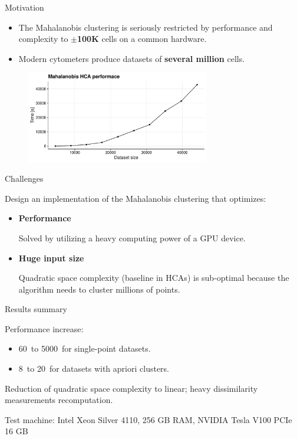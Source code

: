 \documentclass[10pt]{beamer}
\begin{document}
\begin{frame}{Motivation}
	\begin{itemize}
		\item The Mahalanobis clustering is seriously restricted by performance and complexity to \textbf{$\pm$100K} cells on a common hardware.
	
		\item Modern cytometers produce datasets of \textbf{several million} cells.
	\end{itemize}
	\begin{figure}
	\includegraphics[width=8cm]{img/scalability}
	\end{figure}

\end{frame}

\begin{frame}{Challenges}
	
	Design an implementation of the Mahalanobis clustering that optimizes:
	\begin{itemize}
		\item \textbf{Performance}
		
		Solved by utilizing a heavy computing power of a GPU device.
		\item \textbf{Huge input size}
		
		Quadratic space complexity (baseline in HCAs) is sub-optimal because the algorithm needs to cluster millions of points.
	\end{itemize}
	
\end{frame}

\begin{frame}{Results summary}
	
	Performance increase:
	\begin{itemize}
		\item 60\texttimes\ to 5000\texttimes\ for single-point datasets.
		\item 8\texttimes\ to 20\texttimes\ for datasets with apriori clusters.
	\end{itemize}

	Reduction of quadratic space complexity to linear; heavy dissimilarity measurements recomputation.
	
	Test machine: Intel Xeon Silver 4110, 256 GB
	RAM, NVIDIA Tesla V100 PCIe 16 GB
	
\end{frame}
\end{document}
